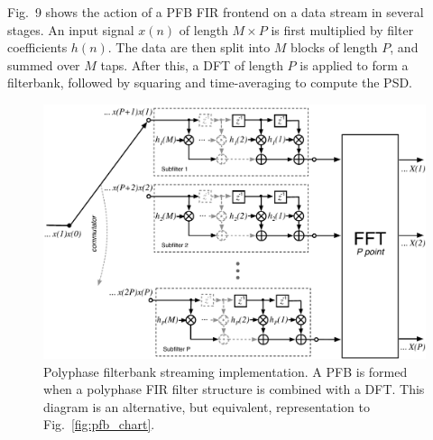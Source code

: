\documentclass{ws-rv961x669}
\begin{document}
Fig.~9 shows the action of a PFB FIR frontend on a data stream in several stages. An input signal $x(n)$ of length $M\times P$ is first multiplied by filter coefficients $h(n)$. The data are then split into $M$ blocks of length $P$, and summed over $M$ taps. After this, a DFT of length $P$ is applied to form a filterbank, followed by squaring and time-averaging to compute the PSD.

\begin{figure}
 \centering
 \includegraphics[width=\textwidth]{./figures/pfb_fir_fft_v2}
 \caption{Polyphase filterbank streaming implementation. A PFB is formed when a polyphase FIR filter structure is combined with a DFT. This diagram is an alternative, but equivalent, representation to Fig.~\ref{fig:pfb_chart}.\label{fig:pfb_fir_fft}}
\end{figure}
\end{document}
